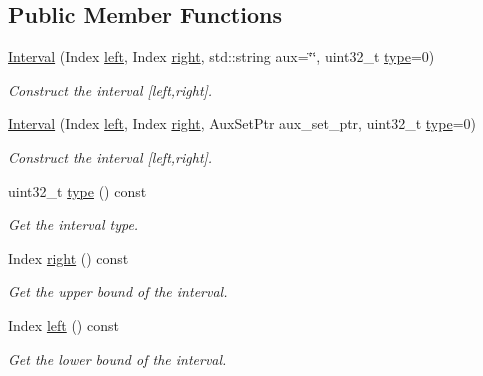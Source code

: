 \subsection*{Public Member Functions}
\begin{DoxyCompactItemize}
\item 
\hyperlink{classgeo__data_1_1Interval_a4aeb907d55df262185dfe06dfb204aa5}{Interval} (Index \hyperlink{classgeo__data_1_1Interval_aa6803997160a6d97fe84c63440642a10}{left}, Index \hyperlink{classgeo__data_1_1Interval_af952a082fcbaba214c19b8e647e9f04e}{right}, std\+::string aux=\char`\"{}\char`\"{}, uint32\+\_\+t \hyperlink{classgeo__data_1_1Interval_a5a20c0a449ed531de53fe529dec35308}{type}=0)
\begin{DoxyCompactList}\small\item\em Construct the interval \mbox{[}left,right\mbox{]}. \end{DoxyCompactList}\item 
\hyperlink{classgeo__data_1_1Interval_ab5246430a8062908f45206ee48e05ec6}{Interval} (Index \hyperlink{classgeo__data_1_1Interval_aa6803997160a6d97fe84c63440642a10}{left}, Index \hyperlink{classgeo__data_1_1Interval_af952a082fcbaba214c19b8e647e9f04e}{right}, Aux\+Set\+Ptr aux\+\_\+set\+\_\+ptr, uint32\+\_\+t \hyperlink{classgeo__data_1_1Interval_a5a20c0a449ed531de53fe529dec35308}{type}=0)
\begin{DoxyCompactList}\small\item\em Construct the interval \mbox{[}left,right\mbox{]}. \end{DoxyCompactList}\item 
uint32\+\_\+t \hyperlink{classgeo__data_1_1Interval_a5a20c0a449ed531de53fe529dec35308}{type} () const 
\begin{DoxyCompactList}\small\item\em Get the interval type. \end{DoxyCompactList}\item 
Index \hyperlink{classgeo__data_1_1Interval_af952a082fcbaba214c19b8e647e9f04e}{right} () const 
\begin{DoxyCompactList}\small\item\em Get the upper bound of the interval. \end{DoxyCompactList}\item 
Index \hyperlink{classgeo__data_1_1Interval_aa6803997160a6d97fe84c63440642a10}{left} () const 
\begin{DoxyCompactList}\small\item\em Get the lower bound of the interval. \end{DoxyCompactList}\item 

\end{DoxyCompactItemize}
